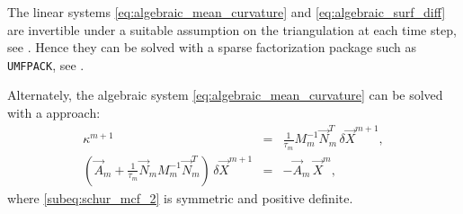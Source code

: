 The linear systems \eqref{eq:algebraic_mean_curvature} and
\eqref{eq:algebraic_surf_diff} are invertible under a suitable assumption on the
triangulation at each time step, see \cite{gflows3d}. Hence they can be solved
with a sparse factorization package such as \verb|UMFPACK|, see \cite{Davis04}.
\newline

Alternately, the algebraic system \eqref{eq:algebraic_mean_curvature} can be
solved with a  approach:
\begin{subequations}
 \begin{eqnarray}
  \kappa^{m + 1} & = & \frac{1}{\tau_m} M_m^{-1} \vec{N}^{T}_m \, \delta
  \vec{X}^{m + 1} \label{subeq:schur_mcf_1} , \\
  (\vec{A}_m + \frac{1}{\tau_m} \vec{N}_m M_m^{-1} \vec{N}^{T}_m) \, \delta
  \vec{X}^{m + 1} & = & - \vec{A}_m \, \vec{X}^{m} , \label{subeq:schur_mcf_2}
 \end{eqnarray}
\end{subequations}
where \eqref{subeq:schur_mcf_2} is symmetric and positive definite.